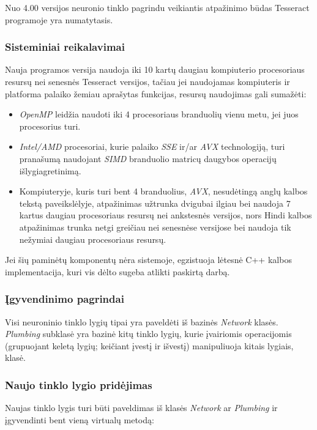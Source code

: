 \documentclass{VUMIFInfBakalaurinis}
\begin{document}
Nuo 4.00 versijos neuronio tinklo pagrindu veikiantis atpažinimo būdas Tesseract programoje yra numatytasis. 

\subsubsection{Sisteminiai reikalavimai}
Nauja programos versija naudoja iki 10 kartų daugiau kompiuterio procesoriaus resursų nei senesnės Tesseract versijos, 
tačiau jei naudojamas kompiuteris ir platforma palaiko žemiau aprašytas funkcijas, resursų naudojimas gali sumažėti:

\begin{itemize}
  \item \textit{OpenMP} leidžia naudoti iki 4 procesoriaus branduolių vienu metu, jei juos procesorius turi.
  \item \textit{Intel/AMD} procesoriai, kurie palaiko \textit{SSE} ir/ar \textit{AVX} technologiją, turi pranašumą naudojant \textit{SIMD} branduolio matricų daugybos operacijų išlygiagretinimą.
  \item Kompiuteryje, kuris turi bent 4 branduolius, \textit{AVX}, nesudėtingą anglų kalbos tekstą paveikslėlyje, atpažinimas užtrunka dvigubai ilgiau bei naudoja 7 kartus daugiau procesoriaus resursų nei ankstesnės versijos, nors Hindi kalbos atpažinimas trunka netgi greičiau nei senesnėse versijose bei naudoja tik nežymiai daugiau procesoriaus resursų.
\end{itemize}

Jei šių paminėtų komponentų nėra sistemoje, egzistuoja lėtesnė C++ kalbos implementacija, kuri vis dėlto sugeba atlikti paskirtą darbą.

\subsubsection{Įgyvendinimo pagrindai}
Visi neuroninio tinklo lygių tipai yra paveldėti iš bazinės \textit{Network} klasės.
\textit{Plumbing} subklasė yra bazinė kitų tinklo lygių, kurie įvairiomis operacijomis (grupuojant keletą lygių; keičiant įvestį ir išvestį) manipuliuoja kitais lygiais, klasė.

\subsubsection{Naujo tinklo lygio pridėjimas}
Naujas tinklo lygis turi būti paveldimas iš klasės \textit{Network} ar \textit{Plumbing} ir įgyvendinti bent vieną virtualų metodą:
\end{document}
